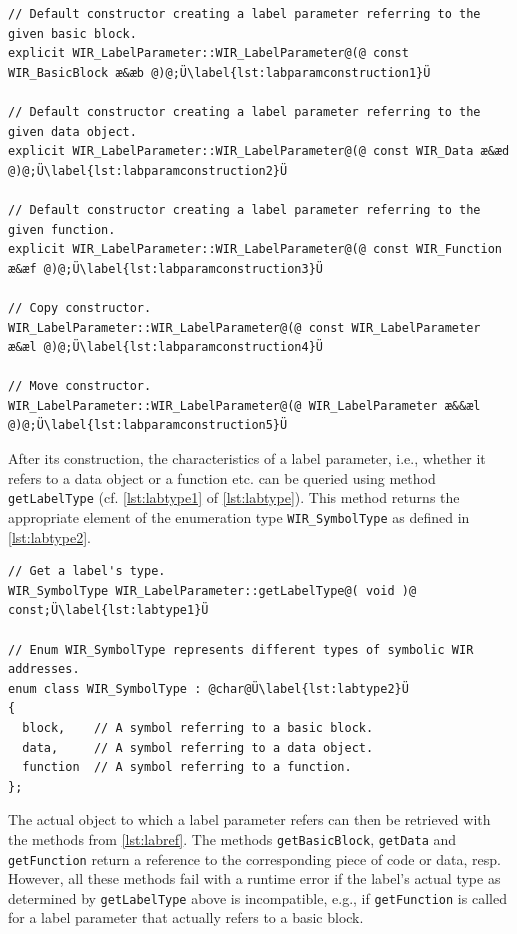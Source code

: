 \begin{lstlisting}[style=code,float=ht,caption={Constructors of Class \texttt{WIR\_LabelParameter}},label=lst:labparamconstruction]
// Default constructor creating a label parameter referring to the given basic block.
explicit WIR_LabelParameter::WIR_LabelParameter@(@ const WIR_BasicBlock æ&æb @)@;Ü\label{lst:labparamconstruction1}Ü

// Default constructor creating a label parameter referring to the given data object.
explicit WIR_LabelParameter::WIR_LabelParameter@(@ const WIR_Data æ&æd @)@;Ü\label{lst:labparamconstruction2}Ü

// Default constructor creating a label parameter referring to the given function.
explicit WIR_LabelParameter::WIR_LabelParameter@(@ const WIR_Function æ&æf @)@;Ü\label{lst:labparamconstruction3}Ü

// Copy constructor.
WIR_LabelParameter::WIR_LabelParameter@(@ const WIR_LabelParameter æ&æl @)@;Ü\label{lst:labparamconstruction4}Ü

// Move constructor.
WIR_LabelParameter::WIR_LabelParameter@(@ WIR_LabelParameter æ&&æl @)@;Ü\label{lst:labparamconstruction5}Ü
\end{lstlisting}

After its construction, the characteristics of a label parameter, i.e., whether it refers to a data object or a function etc. can be queried using method \texttt{getLabelType} (cf. \cref{lst:labtype1} of \cref{lst:labtype}).
This method returns the appropriate element of the enumeration type \texttt{WIR\_SymbolType} as defined in \cref{lst:labtype2}.

\begin{lstlisting}[style=code,float=!b,caption={Label Type Handling of Class \texttt{WIR\_LabelParameter}},label=lst:labtype]
// Get a label's type.
WIR_SymbolType WIR_LabelParameter::getLabelType@( void )@ const;Ü\label{lst:labtype1}Ü

// Enum WIR_SymbolType represents different types of symbolic WIR addresses.
enum class WIR_SymbolType : @char@Ü\label{lst:labtype2}Ü
{
  block,    // A symbol referring to a basic block.
  data,     // A symbol referring to a data object.
  function  // A symbol referring to a function.
};
\end{lstlisting}

The actual object to which a label parameter refers can then be retrieved with the methods from \cref{lst:labref}.
The methods \texttt{getBasicBlock}, \texttt{getData} and \texttt{getFunction} return a reference to the corresponding piece of code or data, resp.
However, all these methods fail with a runtime error if the label's actual type as determined by \texttt{getLabelType} above is incompatible, e.g., if \texttt{getFunction} is called for a label parameter that actually refers to a basic block.

